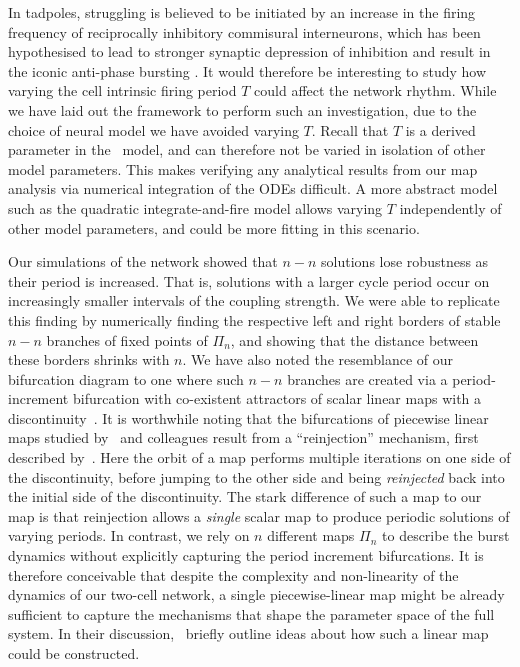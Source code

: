 \documentclass[utf8]{frontiersFPHY} %
\begin{document}
In tadpoles, struggling is believed to be initiated by an increase in the firing frequency of reciprocally inhibitory commisural interneurons, which has been hypothesised to lead to stronger synaptic depression of inhibition and result in the iconic anti-phase bursting \citep{li2007}.
It would therefore be interesting to study how varying the cell intrinsic firing period $T$ could affect the network rhythm.
While we have laid out the framework to perform such an investigation, due to the choice of neural model we have avoided varying $T$.
Recall that $T$ is a derived parameter in the~\citet{morris1981} model, and can therefore not be varied in isolation of other model parameters.
This makes verifying any analytical results from our map analysis via numerical integration of the ODEs difficult.
A more abstract model such as the quadratic integrate-and-fire model \citep{izhikevich2004} allows varying $T$ independently of other model parameters, and could be more fitting in this scenario.

Our simulations of the network showed that $n-n$ solutions lose robustness as their period is increased.
That is, solutions with a larger cycle period occur on increasingly smaller intervals of the coupling strength.
We were able to replicate this finding by numerically finding the respective left and right borders of stable $n-n$ branches of fixed points of $\Pi_n$, and showing that the distance between these borders shrinks with $n$.
We have also noted the resemblance of our bifurcation diagram to one where such $n-n$ branches are created via a period-increment bifurcation with co-existent attractors of scalar linear maps with a discontinuity~\citep{avrutin2012,avrutin2011}.
It is worthwhile noting that the bifurcations of piecewise linear maps studied by~\citeauthor{avrutin2012} and colleagues result from a ``reinjection'' mechanism, first described by~\citet{perez1985}.
Here the orbit of a map performs multiple iterations on one side of the discontinuity, before jumping to the other side and being \textit{reinjected} back into the initial side of the discontinuity.
The stark difference of such a map to our map is that reinjection allows a \emph{single} scalar map to produce periodic solutions of varying periods.
In contrast, we rely on $n$ different maps $\Pi_n$ to describe the burst dynamics without explicitly capturing the period increment bifurcations.
It is therefore conceivable that despite the complexity and non-linearity of the dynamics of our two-cell network, a single piecewise-linear map might be already sufficient to capture the mechanisms that shape the parameter space of the full system.
In their discussion,~\citet{bose2011} briefly outline ideas about how such a linear map could be constructed.
\end{document}
